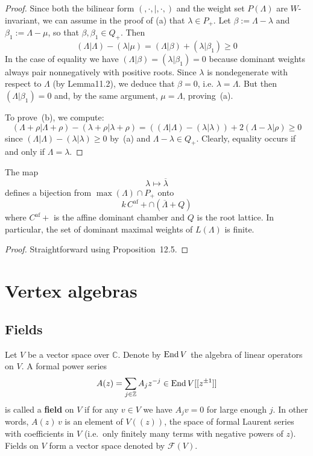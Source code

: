\documentclass[12pt]{article}
\begin{document}
\begin{proof}
Since both the bilinear form $(,\cdot,|,\cdot,)$ and the weight set $P(\Lambda)$ are $W$-invariant, we can assume in the proof of (a) that $\lambda \in P_+$. Let $\beta := \Lambda - \lambda$ and $\beta_1 := \Lambda - \mu$, so that $\beta, \beta_1 \in Q_+$. Then
\[(\Lambda|\Lambda) - (\lambda|\mu) = (\Lambda|\beta) + (\lambda|\beta_1) \ge 0\]
In the case of equality we have $(\Lambda|\beta) = (\lambda|\beta_1) = 0$ because dominant weights always pair nonnegatively with positive roots. 
 Since $\lambda$ is nondegenerate with respect to $\Lambda$ (by Lemma11.2), we deduce that $\beta = 0$, i.e. $\lambda = \Lambda$. But then $(\Lambda|\beta_1) = 0$ and, by the same argument, $\mu = \Lambda$, proving~(a).

To prove~(b), we compute:
\[(\Lambda + \rho|\Lambda + \rho) - (\lambda + \rho|\lambda + \rho)
= ((\Lambda|\Lambda) - (\lambda|\lambda)) + 2(\Lambda - \lambda|\rho) \ge 0
\]
since $(\Lambda|\Lambda) - (\lambda|\lambda) \ge 0$ by~(a) and $\Lambda - \lambda \in Q_+$. Clearly, equality occurs if and only if $\Lambda = \lambda$.
\end{proof}

\begin{proposition}[12.6]
The map
\[
\lambda \longmapsto \overline{\lambda}
\]
defines a bijection from $\operatorname{max}(\Lambda) \cap P_+$ onto
\[k\, C^{\mathrm{af}}+ \cap (\overline{\Lambda} + Q)\]
where $C^{\mathrm{af}}+$ is the affine dominant chamber and $Q$ is the root lattice. In particular, the set of dominant maximal weights of $L(\Lambda)$ is finite.
\end{proposition}

\begin{proof}
Straightforward using Proposition~12.5.
\end{proof}

\section{Vertex algebras}
\subsection{Fields}
Let $V$ be a vector space over $\mathbb{C}$. Denote by $\operatorname{End} V$ the algebra of linear operators on $V$.  
A formal power series
\begin{equation}\label{eq:field}
A(z) = \sum_{j \in \mathbb{Z}} A_j z^{-j} \in \operatorname{End} V[[z^{\pm1}]]
\end{equation}
is called a \textbf{field} on $V$ if for any $v \in V$ we have $A_j v = 0$ for large enough $j$.  
In other words, $A(z)\,v$ is an element of $V((z))$, the space of formal Laurent series with coefficients in $V$ (i.e.\ only finitely many terms with negative powers of $z$).  
Fields on $V$ form a vector space denoted by $\mathcal{F}(V)$.
\end{document}
